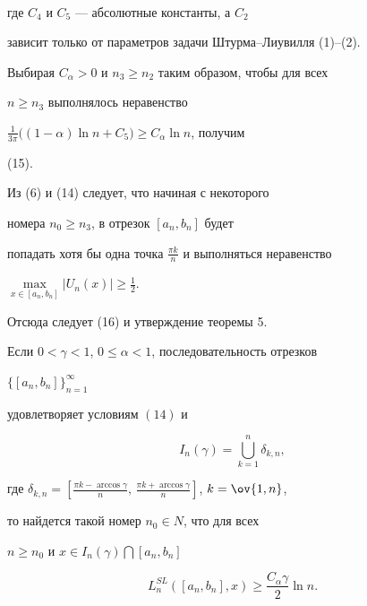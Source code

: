 \begin{pf}
\begin{multline*}
\end{multline*} 


где $C_4$ и $C_5$ --- абсолютные константы, а $C_2$ 


зависит только от параметров задачи Штурма--Лиувилля (1)--(2). 


Выбирая $C_\alpha>0$ и $n_3\ge n_2$ таким образом, чтобы для всех 


$n\ge n_3$ выполнялось неравенство 


$\frac{1}{3\pi}\big((1-\alpha)\ln n+C_5\big)\ge C_\alpha\ln n$, получим 


(15). 


Из (6) и (14) следует, что начиная с некоторого 


номера $n_0\ge n_3$, в отрезок $[a_n,b_n]$ будет 


попадать хотя бы одна точка $\frac{\pi k}{n}$ и выполняться неравенство 


$\max\limits_{x\in[a_n,b_n]}|U_n(x)|\ge\frac{1}{2}$. 


Отсюда следует (16) и утверждение теоремы 5. 


\end{pf} 


 


\begin{lem} 


Если $0<\gamma<1$, $0\le\alpha<1$, последовательность отрезков 


$\{[a_n,b_n]\}^\infty_{n=1}$ 


удовлетворяет условиям $(14)$ и 


\begin{equation} 


I_n(\gamma)=\bigcup^n_{k=1}\delta_{k,n}, 


\end{equation} 


где $\delta_{k,n}=[\frac{\pi k-\arccos\gamma}{n},\, 


\frac{\pi k+\arccos\gamma}{n}]$, $k=\ov{1,n}$, 


то найдется такой номер $n_0\in N$, что для всех 


$n\ge n_0$ и $x\in I_n(\gamma)\bigcap[a_n,b_n]$ 


\begin{equation} 


L^{SL}_n([a_n,b_n],x)\ge\frac{C_\alpha\gamma}{2}\ln n. 


\end{equation} 


\end{lem} 


